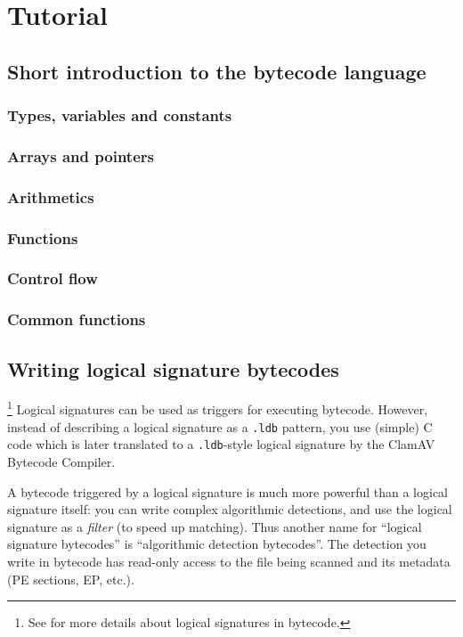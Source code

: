 \chapter{Tutorial}
\section{Short introduction to the bytecode language}
\subsection{Types, variables and constants}
\subsection{Arrays and pointers}
\subsection{Arithmetics}
\subsection{Functions}
\subsection{Control flow}
\subsection{Common functions}

\section[Writing logical signatures]{Writing logical signature bytecodes}
\footnote{See  for more details about logical signatures in
bytecode.}
Logical signatures can be used as triggers for executing bytecode. 
However, instead of describing a logical signature as a \verb+.ldb+ pattern, you use (simple) C code which is later
translated to a \verb+.ldb+-style logical signature by the ClamAV Bytecode Compiler.

A bytecode triggered by a logical signature is much more powerful than a logical signature itself:
you can write complex algorithmic detections, and use the logical signature as a \emph{filter} (to speed up matching).
Thus another name for ``logical signature bytecodes'' is ``algorithmic detection bytecodes''.
The detection you write in bytecode has read-only access to the file being scanned and its metadata
(PE sections, EP, etc.).

